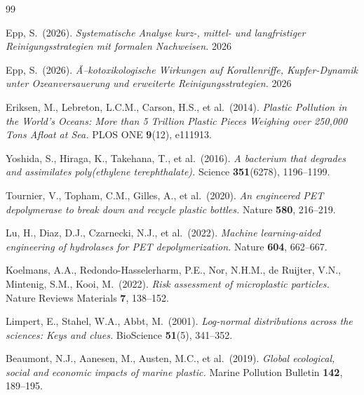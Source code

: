 ﻿\documentclass[12pt,a4paper]{article}
\theoremstyle{definition}
\theoremstyle{remark}
\begin{document}
\begin{thebibliography}{99}

Epp, S.\ (2026).
\textit{Systematische Analyse kurz-, mittel- und langfristiger
Reinigungsstrategien mit formalen Nachweisen.} 2026

Epp, S.\ (2026).
\textit{Ã–kotoxikologische Wirkungen auf Korallenriffe, Kupfer-Dynamik unter
Ozeanversauerung und erweiterte Reinigungsstrategien.} 2026

Eriksen, M., Lebreton, L.C.M., Carson, H.S., et al.\ (2014).
\textit{Plastic Pollution in the World's Oceans: More than 5 Trillion Plastic
Pieces Weighing over 250,000 Tons Afloat at Sea.}
PLOS ONE \textbf{9}(12), e111913.

Yoshida, S., Hiraga, K., Takehana, T., et al.\ (2016).
\textit{A bacterium that degrades and assimilates poly(ethylene terephthalate).}
Science \textbf{351}(6278), 1196--1199.

Tournier, V., Topham, C.M., Gilles, A., et al.\ (2020).
\textit{An engineered PET depolymerase to break down and recycle
plastic bottles.}
Nature \textbf{580}, 216--219.

Lu, H., Diaz, D.J., Czarnecki, N.J., et al.\ (2022).
\textit{Machine learning-aided engineering of hydrolases for
PET depolymerization.}
Nature \textbf{604}, 662--667.

Koelmans, A.A., Redondo-Hasselerharm, P.E., Nor, N.H.M.,
de Ruijter, V.N., Mintenig, S.M., Kooi, M.\ (2022).
\textit{Risk assessment of microplastic particles.}
Nature Reviews Materials \textbf{7}, 138--152.

Limpert, E., Stahel, W.A., Abbt, M.\ (2001).
\textit{Log-normal distributions across the sciences: Keys and clues.}
BioScience \textbf{51}(5), 341--352.

Beaumont, N.J., Aanesen, M., Austen, M.C., et al.\ (2019).
\textit{Global ecological, social and economic impacts of marine plastic.}
Marine Pollution Bulletin \textbf{142}, 189--195.


\end{thebibliography}
\end{document}
